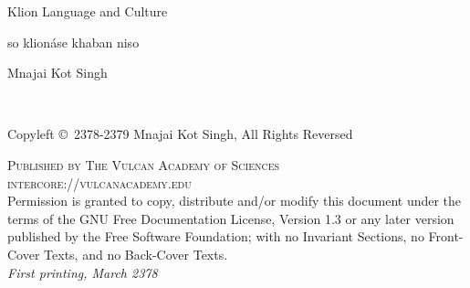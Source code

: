 \documentclass[9pt,fleqn]{book} %
\begin{document}

\begingroup
\thispagestyle{empty}
\centering
\vspace*{9cm}
\par\normalfont\fontsize{35}{35}\sffamily\selectfont
Kli{\ng}on Language and Culture\par %
\vspace*{0.5cm}
\small{so kli{\ng}onáse khaban niso}\par
\vspace*{1cm}
{\Huge Mnajai Kot Singh}\par %
\endgroup


\newpage
~\vfill
\thispagestyle{empty}

\noindent Copyleft \copyright\ 2378-2379 Mnajai Kot Singh, All Rights Reversed\ %

\noindent \textsc{Published by The Vulcan Academy of Sciences}\\ %

\noindent \textsc{intercore://vulcanacademy.edu}\\ %

\noindent Permission is granted to copy, distribute and/or modify this document under the terms of the GNU Free Documentation License, Version 1.3 or any later version published by the Free Software Foundation; with no Invariant Sections, no Front-Cover Texts, and no Back-Cover Texts.\\ %

\noindent \textit{First printing, March 2378} %



\pagestyle{empty} %
\end{document}
